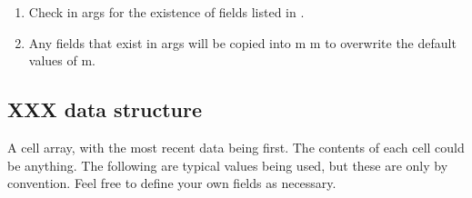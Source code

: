 \documentclass{article}
\begin{document}
\begin{enumerate}
\begin{enumerate}
\item Check in args for the existence of fields listed in .
\item Any fields that exist in args will be copied into m
m to overwrite the default values of m.
\end{enumerate}
\end{enumerate}

\subsection{XXX data structure}

  A cell array, with the most recent data being first. The contents of each cell could be anything. The following are typical values being used, but these are only by convention. Feel free to define your own fields as necessary.
 
\end{document}
